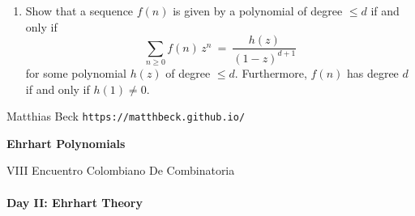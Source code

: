 \documentclass[11pt]{article}
\begin{document}
\begin{enumerate}[(1)]
\item Show that a sequence $f(n)$ is given by a polynomial of degree $\le d$ if and only if
    \[
        \sum_{ n \ge 0 } f(n) \, z^n \ = \ \frac{ h(z) }{ (1-z)^{ d+1 } }
    \]
    for some polynomial $h(z)$ of degree $\le d$.  Furthermore, $f(n)$ has
    degree $d$ if and only if $h(1) \ne 0$.


\end{enumerate}


{\sc Matthias Beck} \hfill {\tt https://matthbeck.github.io/}

\newpage
\begin{center}
\Large{\bf Ehrhart Polynomials} 

\normalsize
VIII Encuentro Colombiano De Combinatoria
\end{center}

\paragraph{Day II: Ehrhart Theory}
\end{document}
